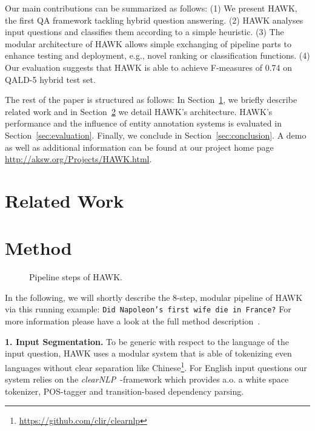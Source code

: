 \documentclass{llncs}
\begin{document}

Our main contributions can be summarized as follows: (1) We present HAWK, the first QA framework tackling hybrid question answering. (2) HAWK analyses input questions and classifies them according to a simple heuristic. (3) The modular architecture of HAWK allows simple exchanging of pipeline parts to enhance testing and deployment, e.g., novel ranking or classification functions. (4) Our evaluation suggests that HAWK is able to achieve F-measures of 0.74 on QALD-5 hybrid test set.

The rest of the paper is structured as follows:
In Section~\ref{sec:relatedwork}, we briefly describe related work and in Section~\ref{sec:method} we detail HAWK's architecture.
HAWK's performance and the influence of entity annotation systems is evaluated in Section~\ref{sec:evaluation}. 
Finally, we conclude in Section~\ref{sec:conclusion}. 
A demo as well as additional information can be found at our project home page \url{http://aksw.org/Projects/HAWK.html}.


\section{Related Work} 
\label{sec:relatedwork}


\section{Method}
\label{sec:method}
\begin{figure}[htb!]
\centering

\caption{Pipeline steps of HAWK.}
\label{fig:hawk_pipeline}
\end{figure}


In the following, we will shortly describe the 8-step, modular pipeline of HAWK via this running example: \texttt{Did Napoleon's first wife die in France?}
For more information please have a look at the full method description~\cite{HAWK_2015}.


\textbf{1. Input Segmentation.} 
To be generic with respect to the language of the input question, HAWK uses a modular system that is able of tokenizing even languages without clear separation like Chinese\footnote{\url{https://github.com/clir/clearnlp}}.
For English input questions our system relies on the \emph{clearNLP}~\cite{choi2011getting}-framework which provides a.o. a white space tokenizer, POS-tagger and transition-based dependency parsing.
\end{document}
